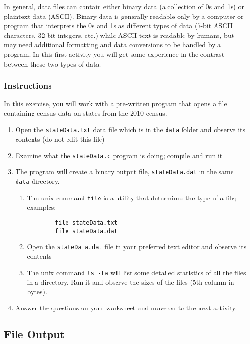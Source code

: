 \documentclass[12pt]{scrartcl}
\begin{document}
In general, data files can contain either binary data (a collection of 0s and 1s) 
or plaintext data (ASCII).  Binary data is generally readable only by a computer 
or program that interprets the 0s and 1s as different types of data (7-bit ASCII 
characters, 32-bit integers, etc.) while ASCII text is readable by humans, but 
may need additional formatting and data conversions to be handled by a 
program.  In this first activity you will get some experience in the contrast 
between these two types of data.

\subsubsection*{Instructions}

In this exercise, you will work with a pre-written program that opens a file 
containing census data on states from the 2010 census.  
\begin{enumerate}
  \item Open the \texttt{stateData.txt} data file which is in the
  \texttt{data} folder and observe its contents 
	(do not edit this file)
  \item Examine what the \texttt{stateData.c} program is doing; 
	compile and run it
  \item The program will create a binary output file, \texttt{stateData.dat} 
	in the same \texttt{data} directory.
	\begin{enumerate}
	  \item The unix command \texttt{file} is a utility that determines the 
		type of a file; examples:
		
		\begin{verbatim}
		file stateData.txt
		file stateData.dat
		\end{verbatim}
	  \item Open the \texttt{stateData.dat} file in your preferred 
	    text editor and observe its contents
	  \item The unix command \texttt{ls -la} will list some detailed 
		statistics of all the files in a directory.  Run it and observe the sizes of the 
		files (5th column in bytes).
	\end{enumerate}
  \item Answer the questions on your worksheet and move on to the next activity.
\end{enumerate}

\subsection{File Output}
\end{document}
